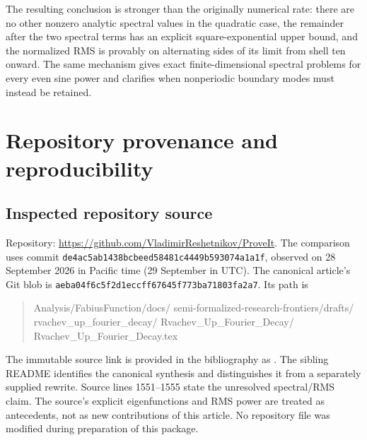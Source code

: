 \documentclass[11pt,a4paper]{article}
\theoremstyle{definition}
\theoremstyle{remark}
\newcommand{\repoSHA}{\texttt{de4ac5ab1438bcbeed58481c4449b593074a1a1f}}
\newcommand{\blobSHA}{\texttt{aeba04f6c5f2d1eccff67645f773ba71803fa2a7}}
\numberwithin{equation}{section}
\begin{document}
The resulting conclusion is stronger than the originally numerical rate:
there are no other nonzero analytic spectral values in the quadratic case,
the remainder after the two spectral terms has an explicit
square-exponential upper bound, and the normalized RMS is provably on
alternating sides of its limit from shell ten onward. The same mechanism
gives exact finite-dimensional spectral problems for every even sine power
and clarifies when nonperiodic boundary modes must instead be retained.

\appendix
\section{Repository provenance and reproducibility}
\label{app:provenance}

\subsection{Inspected repository source}
Repository: \url{https://github.com/VladimirReshetnikov/ProveIt}.
The comparison uses commit \repoSHA, observed on 28 September 2026 in
Pacific time (29 September in UTC). The canonical article's Git blob is
\blobSHA. Its path is
\begin{quote}\small\ttfamily\raggedright
Analysis/FabiusFunction/docs/\allowbreak
semi-formalized-research-frontiers/drafts/\allowbreak
rvachev\_up\_fourier\_decay/\allowbreak
Rvachev\_Up\_Fourier\_Decay/\allowbreak
Rvachev\_Up\_Fourier\_Decay.tex
\end{quote}
The immutable source link is provided in the bibliography as \cite{repo}.
The sibling README identifies the canonical synthesis and distinguishes it
from a separately supplied rewrite. Source lines 1551--1555 state the
unresolved spectral/RMS claim. The source's explicit eigenfunctions and RMS
power are treated as antecedents, not as new contributions of this article.
No repository file was modified during preparation of this package.
\end{document}
